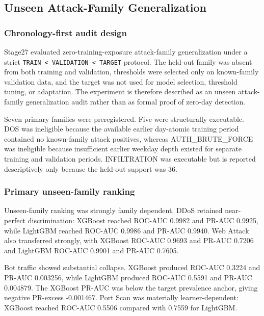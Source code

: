 
\subsection{Unseen Attack-Family Generalization}

\subsubsection{Chronology-first audit design}

Stage27 evaluated zero-training-exposure attack-family generalization under a strict \texttt{TRAIN < VALIDATION < TARGET} protocol. The held-out family was absent from both training and validation, thresholds were selected only on known-family validation data, and the target was not used for model selection, threshold tuning, or adaptation. The experiment is therefore described as an unseen attack-family generalization audit rather than as formal proof of zero-day detection.

Seven primary families were preregistered. Five were structurally executable. DOS was ineligible because the available earlier day-atomic training period contained no known-family attack positives, whereas AUTH\_BRUTE\_FORCE was ineligible because insufficient earlier weekday depth existed for separate training and validation periods. INFILTRATION was executable but is reported descriptively only because the held-out support was 36.

\subsubsection{Primary unseen-family ranking}

Unseen-family ranking was strongly family dependent. DDoS retained near-perfect discrimination: XGBoost reached ROC-AUC 0.9982 and PR-AUC 0.9925, while LightGBM reached ROC-AUC 0.9986 and PR-AUC 0.9940. Web Attack also transferred strongly, with XGBoost ROC-AUC 0.9693 and PR-AUC 0.7206 and LightGBM ROC-AUC 0.9901 and PR-AUC 0.7605.

Bot traffic showed substantial collapse. XGBoost produced ROC-AUC 0.3224 and PR-AUC 0.003256, while LightGBM produced ROC-AUC 0.5591 and PR-AUC 0.004879. The XGBoost PR-AUC was below the target prevalence anchor, giving negative PR-excess -0.001467. Port Scan was materially learner-dependent: XGBoost reached ROC-AUC 0.5506 compared with 0.7559 for LightGBM.


